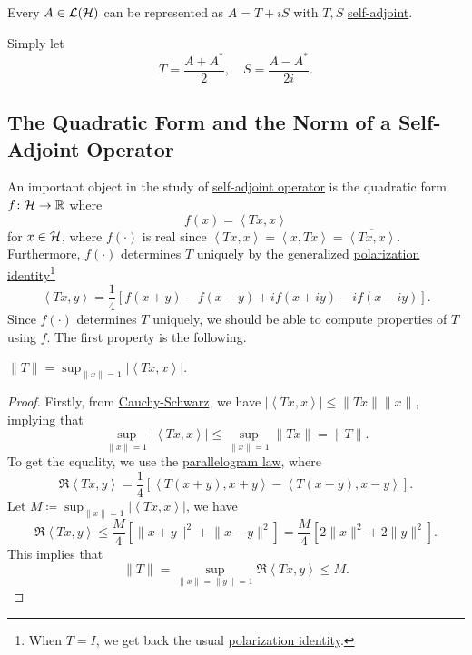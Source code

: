 \begin{remark}
	Every \(A\in \mathcal{\MakeUppercase{l}} (\mathcal{\MakeUppercase{h}} )\) can be represented as \(A = T+iS\) with \(T, S\) \hyperref[def:self-adjoint-op]{self-adjoint}.
\end{remark}
\begin{explanation}
	Simply let
	\[
		T = \frac{A + A^{\ast} }{2},\quad S = \frac{A - A^{\ast} }{2i}.
	\]
\end{explanation}

\subsection{The Quadratic Form and the Norm of a Self-Adjoint Operator}
An important object in the study of \hyperref[def:self-adjoint-op]{self-adjoint operator} is the quadratic form \(f\colon \mathcal{\MakeUppercase{h}} \to \mathbb{\MakeUppercase{r}} \) where
\[
	f(x) = \left\langle Tx, x \right\rangle
\]
for \(x\in \mathcal{\MakeUppercase{h}} \), where \(f(\cdot)\) is real since \(\left\langle Tx, x \right\rangle = \left\langle x, Tx \right\rangle = \overline{\left\langle Tx, x \right\rangle }\). Furthermore, \(f(\cdot)\) determines \(T\) uniquely by the generalized \hyperref[lma:polarization-identity]{polarization identity}\footnote{When \(T = I\), we get back the usual \hyperref[lma:polarization-identity]{polarization identity}.}
\[
	\left\langle Tx, y \right\rangle = \frac{1}{4} \left[ f(x+ y) - f(x-y) + if(x+iy) - if(x-iy) \right].
\]
Since \(f(\cdot)\) determines \(T\) uniquely, we should be able to compute properties of \(T\) using \(f\). The first property is the following.
\begin{proposition}
	\(\lVert T \rVert = \sup _{\lVert x \rVert = 1} \vert \left\langle Tx, x \right\rangle  \vert \).
\end{proposition}
\begin{proof}
	Firstly, from \hyperref[thm:Cauchy-Schwarz-ineq]{Cauchy-Schwarz}, we have \(\vert \left\langle Tx, x \right\rangle \vert \leq \lVert Tx \rVert \lVert x \rVert \), implying that
	\[
		\sup _{\lVert x \rVert = 1} \vert \left\langle Tx, x \right\rangle  \vert \leq \sup _{\lVert x \rVert = 1} \lVert Tx \rVert = \lVert T \rVert .
	\]
	To get the equality, we use the \hyperref[lma:parallelogram-law]{parallelogram law}, where
	\[
		\Re \left\langle Tx, y \right\rangle
		= \frac{1}{4} \left[ \left\langle T(x+ y) , x+y\right\rangle - \left\langle T(x-y), x-y \right\rangle  \right].
	\]
	Let \(M\coloneqq \sup _{\lVert x \rVert = 1} \vert \left\langle Tx, x \right\rangle  \vert \), we have
	\[
		\Re\left\langle Tx, y \right\rangle
		\leq \frac{M}{4} \left[ \lVert x+y \rVert ^{2} + \lVert x-y \rVert ^{2}  \right]
		= \frac{M}{4} \left[ 2\lVert x \rVert ^{2} + 2 \lVert y \rVert ^{2} \right].
	\]
	This implies that
	\[
		\lVert T \rVert = \sup _{\lVert x \rVert = \lVert y \rVert = 1} \Re \left\langle Tx, y \right\rangle  \leq M.
	\]
\end{proof}

